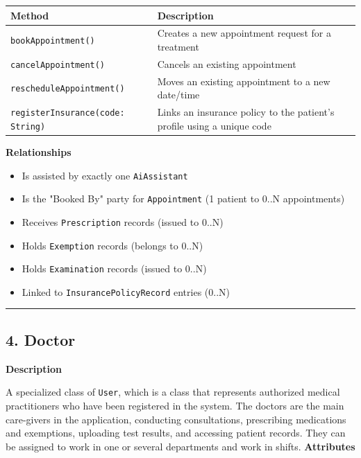 \documentclass[12pt, a4paper]{article}
\begin{document}
\begin{center}
\small
\renewcommand{\arraystretch}{1.35}
\begin{tabularx}{\textwidth}{|M|Y|}
\hline
{}
\textbf{Method} & \textbf{Description} \\ \hline
\texttt{bookAppointment()} & Creates a new appointment request for a treatment \\ \hline
\texttt{cancelAppointment()} & Cancels an existing appointment \\ \hline
\texttt{rescheduleAppointment()} & Moves an existing appointment to a new date/time \\ \hline
\texttt{registerInsurance(code: String)} & Links an insurance policy to the patient's profile using a unique code \\ \hline
\end{tabularx}
\end{center}

\textbf{Relationships}

\begin{itemize}
    \item Is assisted by exactly one \texttt{AiAssistant}
    \item Is the "Booked By" party for \texttt{Appointment} (1 patient to 0..N appointments)
    \item Receives \texttt{Prescription} records (issued to 0..N)
    \item Holds \texttt{Exemption} records (belongs to 0..N)
    \item Holds \texttt{Examination} records (issued to 0..N)
    \item Linked to \texttt{InsurancePolicyRecord} entries (0..N)
\end{itemize}

\par\medskip\hrule\medskip

\subsection{4. Doctor}\label{sec:4-doctor}

\textbf{Description}

A specialized class of \texttt{User}, which is a class that represents authorized medical practitioners who have been registered in the system. The doctors are the main care-givers in the application, conducting consultations, prescribing medications and exemptions, uploading test results, and accessing patient records. They can be assigned to work in one or several departments and work in shifts.
\textbf{Attributes}
\end{document}
